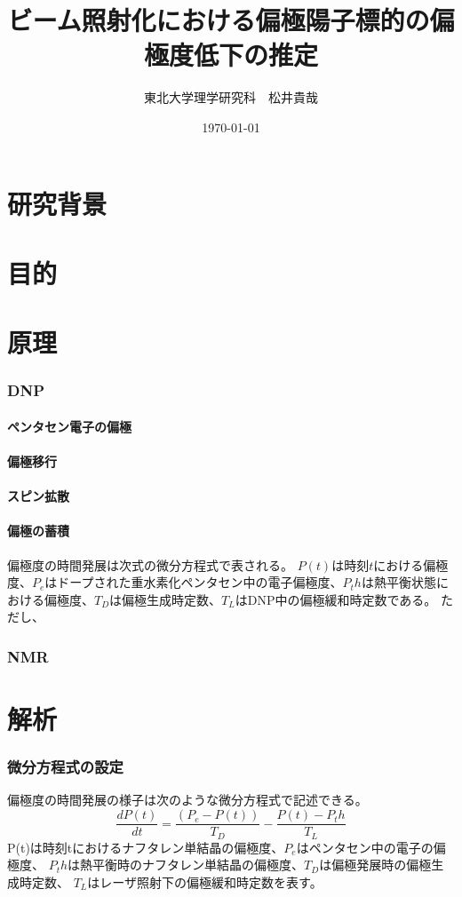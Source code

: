 \documentclass[a5j]{jsarticle}
\title{ビーム照射化における偏極陽子標的の偏極度低下の推定}
\author{東北大学理学研究科　松井貴哉}
\date{\today}
\begin{document}
\maketitle
\part{研究背景}

\part{目的}

\part{原理}
\section{DNP}
\subsection{ペンタセン電子の偏極}
\subsection{偏極移行}
\subsection{スピン拡散}
\subsection{偏極の蓄積}
偏極度の時間発展は次式の微分方程式で表される。
$P(t)$は時刻$t$における偏極度、$P_e$はドープされた重水素化ペンタセン中の電子偏極度、$P_th$は熱平衡状態における偏極度、$T_D$は偏極生成時定数、$T_L$はDNP中の偏極緩和時定数である。
ただし、


\section{NMR}


\part{解析}

\section{微分方程式の設定}
偏極度の時間発展の様子は次のような微分方程式で記述できる。
\begin{equation}
  \frac{dP(t)}{dt}=\frac{(P_e-P(t))}{T_D}-\frac{P(t)-P_th}{T_L}
\end{equation}
P(t)は時刻tにおけるナフタレン単結晶の偏極度、$P_e$はペンタセン中の電子の偏極度、
$P_th$は熱平衡時のナフタレン単結晶の偏極度、$T_D$は偏極発展時の偏極生成時定数、 $T_L$はレーザ照射下の偏極緩和時定数を表す。
\end{document}
